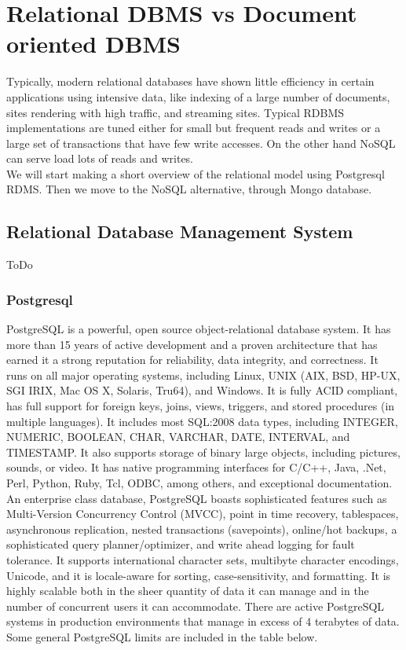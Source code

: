 \chapter{Relational DBMS vs Document oriented DBMS}

Typically, modern relational databases have shown little efficiency in certain applications using intensive data, like indexing of a large number of documents, sites rendering with high traffic, and streaming sites. Typical RDBMS implementations are tuned either for small but frequent reads and writes or a large set of transactions that have few write accesses. On the other hand NoSQL can serve load lots of reads and writes.\\

We will start making a short overview of the relational model using Postgresql RDMS. Then we move to the NoSQL alternative, through Mongo database.\\

\section{Relational Database Management System}

ToDo

\subsection{Postgresql}

PostgreSQL is a powerful, open source object-relational database system. It has more than 15 years of active development and a proven architecture that has earned it a strong reputation for reliability, data integrity, and correctness. It runs on all major operating systems, including Linux, UNIX (AIX, BSD, HP-UX, SGI IRIX, Mac OS X, Solaris, Tru64), and Windows. It is fully ACID compliant, has full support for foreign keys, joins, views, triggers, and stored procedures (in multiple languages). It includes most SQL:2008 data types, including INTEGER, NUMERIC, BOOLEAN, CHAR, VARCHAR, DATE, INTERVAL, and TIMESTAMP. It also supports storage of binary large objects, including pictures, sounds, or video. It has native programming interfaces for C/C++, Java, .Net, Perl, Python, Ruby, Tcl, ODBC, among others, and exceptional documentation. \\

An enterprise class database, PostgreSQL boasts sophisticated features such as Multi-Version Concurrency Control (MVCC), point in time recovery, tablespaces, asynchronous replication, nested transactions (savepoints), online/hot backups, a sophisticated query planner/optimizer, and write ahead logging for fault tolerance. It supports international character sets, multibyte character encodings, Unicode, and it is locale-aware for sorting, case-sensitivity, and formatting. It is highly scalable both in the sheer quantity of data it can manage and in the number of concurrent users it can accommodate. There are active PostgreSQL systems in production environments that manage in excess of 4 terabytes of data. Some general PostgreSQL limits are included in the table below.\\

